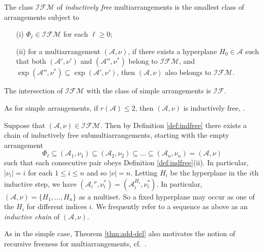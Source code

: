 \begin{defn}
\label{def:indfree}
The class ${{\mathcal {IFM}}}$ of \emph{inductively free} multiarrangements 
is the smallest class of arrangements subject to
\begin{itemize}
\item[(i)] $\Phi_\ell \in {{\mathcal {IFM}}}$ for each $\ell \ge 0$;
\item[(ii)] for a multiarrangement $({{\mathcal A}}, \nu)$, if there exists a hyperplane $H_0 \in {{\mathcal A}}$ such that both
$({{\mathcal A}}', \nu')$ and $({{\mathcal A}}'', \nu^*)$ belong to ${{\mathcal {IFM}}}$, and $\exp ({{\mathcal A}}'', \nu^*) \subseteq \exp ({{\mathcal A}}', \nu')$, 
then $({{\mathcal A}}, \nu)$ also belongs to ${{\mathcal {IFM}}}$.
\end{itemize}
\end{defn}

\begin{remark}
\label{rem:indfree}
The intersection of ${{\mathcal {IFM}}}$ with the class of 
simple arrangements is ${{\mathcal {IF}}}$.
\end{remark}

As for simple arrangements, if $r({{\mathcal A}}) \le 2$,
then $({{\mathcal A}}, \nu)$  is inductively free,  
\cite[Cor.\ 7]{ziegler:multiarrangements}.

\begin{remark}
\label{rem:indchain}
Suppose that $({{\mathcal A}}, \nu) \in {{\mathcal {IFM}}}$. 
Then by Definition \ref{def:indfree} there exists a chain of 
inductively free submultiarrangements, starting with the 
empty arrangement 
\[
\Phi_\ell \subseteq ({{\mathcal A}}_1, \nu_1) \subseteq ({{\mathcal A}}_2, \nu_2) \subseteq \ldots \subseteq ({{\mathcal A}}_n, \nu_n) = ({{\mathcal A}}, \nu) 
\]
such that each consecutive pair obeys Definition \ref{def:indfree}(ii). 
In particular, $|\nu_i| = i$ for each $1 \le i \le n$ and so $|\nu| = n$.
Letting $H_i$ be the hyperplane in the $i$th inductive step,
we have
 $({{\mathcal A}}_i'', \nu_i^*) = ({{\mathcal A}}_i^{H_i}, \nu_i^*)$. 
In particular, $({{\mathcal A}}, \nu) = \{H_1, \ldots, H_n\}$ as a multiset.
So a fixed hyperplane may occur as one of the $H_i$ for different 
indices $i$.
We frequently refer to a sequence as above as 
an \emph{inductive chain} of $({{\mathcal A}}, \nu)$. 
\end{remark}

As in the simple case, 
Theorem \ref{thm:add-del} also motivates the notion of recursive 
freeness for multiarrangements, cf.~\cite[Def.\ 4.60]{orlikterao:arrangements}.

